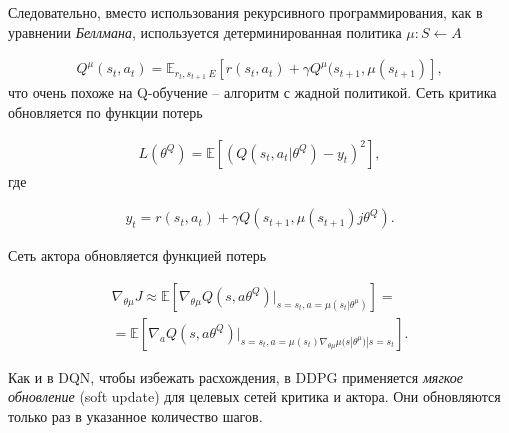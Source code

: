 Следовательно, вместо использования рекурсивного программирования, как в уравнении {\itshape Беллмана}, используется детерминированная политика ${\mu : S \leftarrow A}$ \cite{lillicrap2015continuous}

\begin{equation}
    \label{eq:ch1-ddpg-1}
    \begin{multlined}
        Q^\mu (s_t, a_t) = \mathbb{E}_{r_t, s_{t+1}~E}[r(s_t, a_t) + \gamma Q^\mu(s_{t+1}, \mu(s_{t+1})],
    \end{multlined}
\end{equation}
что очень похоже на Q-обучение – алгоритм с жадной политикой. Сеть критика обновляется по функции потерь

\begin{equation}
    \label{eq:ch1-ddpg-1}
    \begin{multlined}
        L(\theta^Q) = \mathbb{E}[(Q(s_t, a_t|\theta^Q) - y_t)^2],
    \end{multlined}
\end{equation}
где

\begin{equation}
    \label{eq:ch1-ddpg-3}
    \begin{multlined}
        y_t = r(s_t, a_t) + \gamma Q(s_{t+1}, \mu(s_{t+1})j\theta^Q).
    \end{multlined}
\end{equation}

Сеть актора обновляется функцией потерь

\begin{equation}
    \label{eq:ch1-ddpg-4}
    \begin{multlined}
        \nabla_{\theta \mu} J \approx \mathbb{E}[\nabla_{\theta \mu} Q(s, a \theta^Q)|_{s=s_t,a=\mu(s_t|\theta^\mu)}] = \\
        = \mathbb{E}[\nabla_a Q(s, a \theta^Q)|_{s=s_t,a=\mu(s_t) \nabla_{\theta \mu} \mu (s|\theta^\mu)|s=s_t}].
    \end{multlined}
\end{equation}

Как и в DQN, чтобы избежать расхождения, в DDPG применяется \textit{мягкое обновление} (soft update) для целевых сетей критика и актора. Они обновляются только раз в указанное количество шагов.
